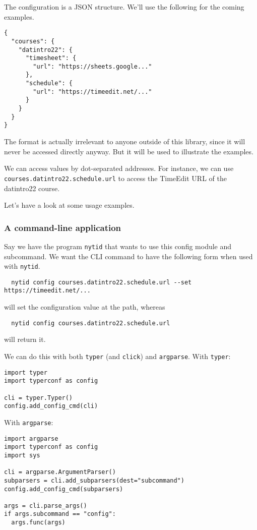 The configuration is a JSON structure.
We'll use the following for the coming examples.
\label{ConfigStructure}
\begin{verbatim}
{
  "courses": {
    "datintro22": {
      "timesheet": {
        "url": "https://sheets.google..."
      },
      "schedule": {
        "url": "https://timeedit.net/..."
      }
    }
  }
}
\end{verbatim}
The format is actually irrelevant to anyone outside of this library, since it 
will never be accessed directly anyway.
But it will be used to illustrate the examples.

We can access values by dot-separated addresses.
For instance, we can use \texttt{courses.datintro22.schedule.url} to access the 
TimeEdit URL of the datintro22 course.

Let's have a look at some usage examples.

\subsubsection{A command-line application}

Say we have the program \texttt{nytid} that wants to use this config module and 
subcommand.
We want the CLI command to have the following form when used with 
\texttt{nytid}.
\begin{verbatim}
  nytid config courses.datintro22.schedule.url --set https://timeedit.net/...
\end{verbatim}
will set the configuration value at the path, whereas
\begin{verbatim}
  nytid config courses.datintro22.schedule.url
\end{verbatim}
will return it.

We can do this with both \texttt{typer} (and \texttt{click}) and \texttt{argparse}.
With \texttt{typer}:
\begin{verbatim}
import typer
import typerconf as config

cli = typer.Typer()
config.add_config_cmd(cli)
\end{verbatim}

With \texttt{argparse}:
\begin{verbatim}
import argparse
import typerconf as config
import sys

cli = argparse.ArgumentParser()
subparsers = cli.add_subparsers(dest="subcommand")
config.add_config_cmd(subparsers)

args = cli.parse_args()
if args.subcommand == "config":
  args.func(args)
\end{verbatim}

